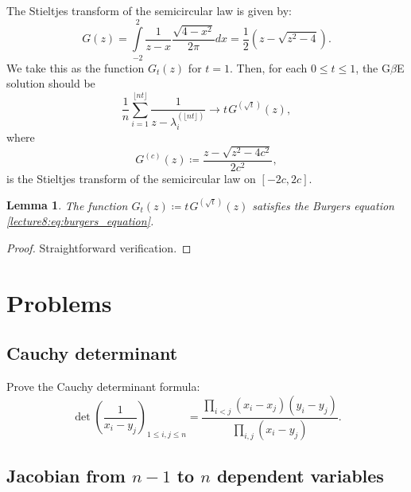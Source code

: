 \documentclass[letterpaper,11pt,oneside,reqno]{book}
\numberwithin{equation}{chapter}  %
\newcommand{\ssp}{\hspace{1pt}}
\newtheorem{lemma}[proposition]{Lemma}
\theoremstyle{definition}
\begin{document}
The Stieltjes transform of the semicircular law is given by:
\begin{equation*}
	G(z) = \int\limits_{-2}^{2}\frac{1}{z-x}\frac{\sqrt{4-x^2}}{2\pi}dx =
	\frac{1}{2} \left(z-\sqrt{z^2-4}\right).
\end{equation*}
We take this as the function $G_t(z)$ for $t=1$.
Then, for each $0\le t\le 1$, the 
G$\beta$E solution should be 
\begin{equation*}
	\frac{1}{n}\sum_{i=1}^{\lfloor nt \rfloor }\frac{1}{z-\lambda_i^{(\lfloor nt \rfloor )}}
	\to t\ssp G^{(\sqrt t)}(z),
\end{equation*}
where 
\begin{equation*}
	G^{(c)}(z) \coloneqq \frac{z-\sqrt{z^2-4c^2}}{2c^2},
\end{equation*}
is the Stieltjes transform of the semicircular law on $[-2c, 2c]$.

\begin{lemma}
	\label{lecture8:lemma:semicircle_and_burgers}
	The function $G_t(z)\coloneqq t\ssp G^{(\sqrt t)}(z)$
	satisfies the Burgers equation \eqref{lecture8:eq:burgers_equation}.
\end{lemma}
\begin{proof}
	Straightforward verification.
\end{proof}
















\section{Problems}


\subsection{Cauchy determinant}
\label{lecture8:prob:cauchy}

Prove the Cauchy determinant formula:
\begin{equation*}
	\det\left( \frac{1}{x_i-y_j} \right)_{1\le i,j\le n}=
	\frac{\prod_{i<j}(x_i-x_j)(y_i-y_j)}{\prod_{i,j}(x_i-y_j)}.
\end{equation*}

\subsection{Jacobian from $n-1$ to $n$ dependent variables}
\label{lecture8:prob:n_n_1}
\end{document}
